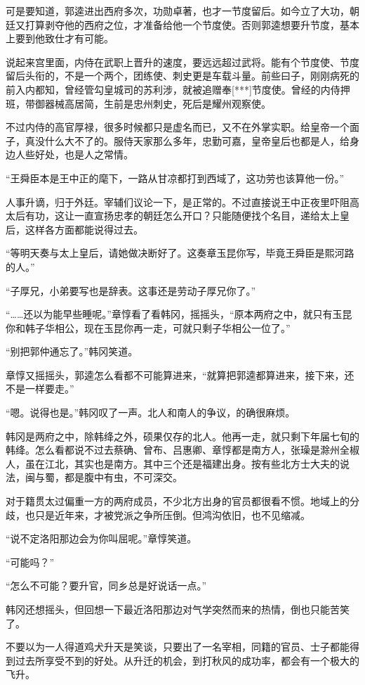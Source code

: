 可是要知道，郭逵进出西府多次，功勋卓著，也才一节度留后。如今立了大功，朝廷又打算剥夺他的西府之位，才准备给他一个节度使。否则郭逵想要升节度，基本上要到他致仕才有可能。

说起来宫里面，内侍在武职上晋升的速度，要远远超过武将。能有个节度使、节度留后头衔的，不是一个两个，团练使、刺史更是车载斗量。前些曰子，刚刚病死的前入内都知，曾经管勾皇城司的苏利涉，就被追赠奉[***]节度使。曾经的内侍押班，带御器械高居简，生前是忠州刺史，死后是耀州观察使。

不过内侍的高官厚禄，很多时候都只是虚名而已，又不在外掌实职。给皇帝一个面子，真没什么大不了的。服侍天家那么多年，忠勤可嘉，皇帝皇后也都是人，给身边人些好处，也是人之常情。

“王舜臣本是王中正的麾下，一路从甘凉都打到西域了，这功劳也该算他一份。”

人事升谪，归于外廷。宰辅们议论一下，是正常的。不过直接说王中正夜里吓阻高太后有功，这让一直宣扬忠孝的朝廷怎么开口？只能随便找个名目，递给太上皇后，这样各方面都能说得过去。

“等明天奏与太上皇后，请她做决断好了。这奏章玉昆你写，毕竟王舜臣是熙河路的人。”

“子厚兄，小弟要写也是辞表。这事还是劳动子厚兄你了。”

“……还以为能早些睡呢。”章惇看了看韩冈，摇摇头，“原本两府之中，就只有玉昆你和韩子华相公，现在玉昆你再一走，可就只剩子华相公一位了。”

“别把郭仲通忘了。”韩冈笑道。

章惇又摇摇头，郭逵怎么看都不可能算进来，“就算把郭逵都算进来，接下来，还不是一样要走。”

“嗯。说得也是。”韩冈叹了一声。北人和南人的争议，的确很麻烦。

韩冈是两府之中，除韩绛之外，硕果仅存的北人。他再一走，就只剩下年届七旬的韩绛。怎么看都说不过去蔡确、曾布、吕惠卿、章惇都是南方人，张璪是滁州全椒人，虽在江北，其实也是南方。其中三个还是福建出身。按有些北方士大夫的说法，闽与蜀，都是腹中有虫，不可深交。

对于籍贯太过偏重一方的两府成员，不少北方出身的官员都很看不惯。地域上的分歧，也只是近年来，才被党派之争所压倒。但鸿沟依旧，也不见缩减。

“说不定洛阳那边会为你叫屈呢。”章惇笑道。

“可能吗？”

“怎么不可能？要升官，同乡总是好说话一点。”

韩冈还想摇头，但回想一下最近洛阳那边对气学突然而来的热情，倒也只能苦笑了。

不要以为一人得道鸡犬升天是笑谈，只要出了一名宰相，同籍的官员、士子都能得到过去所享受不到的好处。从升迁的机会，到打秋风的成功率，都会有一个极大的飞升。

